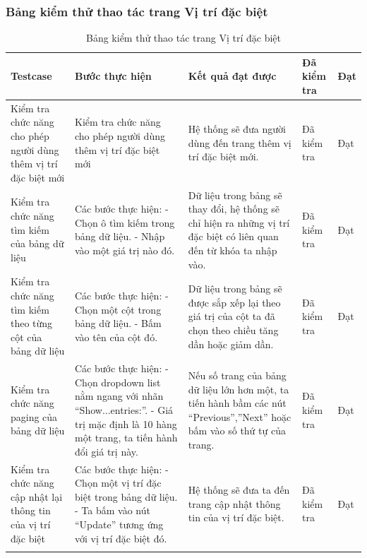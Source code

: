 \documentclass[a4paper]{article}
\begin{document}
\subsubsection*{Bảng kiểm thử thao tác trang Vị trí đặc biệt}
\begin{longtable}{ | p{} |p{} | p{}  | p{}  | p{}  | } 
\hline
\textbf{Testcase}& \textbf{Bước thực hiện}& \textbf{Kết quả đạt được} & \textbf{Đã kiểm tra}& \textbf{Đạt} \\ 
\hline
\hline
Kiểm tra chức năng cho phép người dùng thêm vị trí đặc biệt mới &
Kiểm tra chức năng cho phép người dùng thêm vị trí đặc biệt mới 
&
Hệ thống sẽ đưa người dùng đến trang thêm vị trí đặc biệt mới.
&
Đã kiểm tra &
Đạt \\

\hline
Kiểm tra chức năng tìm kiếm của bảng dữ liệu &
Các bước thực hiện: \newline
- Chọn ô tìm kiếm trong bảng dữ liệu.  \newline
- Nhập vào một giá trị nào đó.  \newline 
&
Dữ liệu trong bảng sẽ thay đổi, hệ thống sẽ chỉ hiện ra những vị trí đặc biệt có liên quan đến từ khóa ta nhập vào.
&
Đã kiểm tra &
Đạt \\

\hline
Kiểm tra chức năng tìm kiếm theo từng cột của bảng dữ liệu &
Các bước thực hiện: \newline
- Chọn một cột trong bảng dữ liệu.  \newline
- Bấm vào tên của cột đó.   \newline 
&
Dữ liệu trong bảng sẽ được sắp xếp lại theo giá trị của cột ta đã chọn theo chiều tăng dần hoặc giảm dần.
&
Đã kiểm tra &
Đạt \\

\hline
Kiểm tra chức năng paging của bảng dữ liệu &
Các bước thực hiện: \newline
- Chọn dropdown list nằm ngang với nhãn “Show...entries:”.  \newline
- Giá trị mặc định là 10 hàng một trang, ta tiến hành đổi giá trị này.   \newline 
&
Nếu số trang của bảng dữ liệu lớn hơn một, ta tiến hành bầm các nút “Previous”,”Next” hoặc bấm vào số thứ tự của trang.
&
Đã kiểm tra &
Đạt \\

\hline
Kiểm tra chức năng cập nhật lại thông tin của vị trí đặc biệt &
Các bước thực hiện: \newline
- Chọn một vị trí đặc biệt trong bảng dữ liệu.   \newline
- Ta bấm vào nút “Update” tương ứng với vị trí đặc biệt đó.
&
Hệ thống sẽ đưa ta đến trang cập nhật thông tin của vị trí đặc biệt.
&
Đã kiểm tra &
Đạt \\
\hline
\caption{Bảng kiểm thử thao tác trang Vị trí đặc biệt}
\end{longtable}
\end{document}
